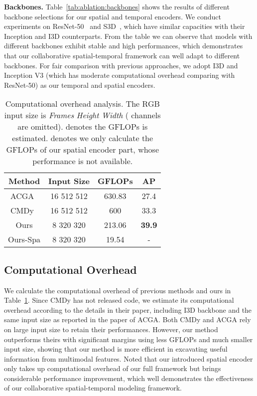 \documentclass[final]{cvpr}
\begin{document}
\textbf{Backbones.} 
Table~\ref{tab:ablation:backbones} shows the results of different backbone selections for our spatial and temporal encoders. 
We conduct experiments on ResNet-50~\cite{he2016deep} and S3D~\cite{xie2018rethinking}, which have similar capacities with their Inception and I3D counterparts. 
From the table we can observe that models with different backbones exhibit stable and high performances, which demonstrates that our collaborative spatial-temporal framework can well adapt to different backbones. 
For fair comparison with previous approaches, we adopt I3D and Inception V3 (which has moderate computational overhead comparing with ResNet-50) as our temporal and spatial encoders.

\begin{table}[!htbp]
   \centering
   \begin{tabular}{|c|c|c|c|}
      \hline
      \textbf{Method} & \textbf{Input Size} & \textbf{GFLOPs} & \textbf{AP} \\
      \hline
      ACGA~\cite{wang2019asymmetric} & 16  512  512 & 630.83 & 27.4 \\
      CMDy~\cite{wang2020context}  & 16  512  512 &  600 & 33.3 \\
      Ours & 8  320  320 & 213.06 & \textbf{39.9} \\
      Ours-Spa  & 8  320  320 & 19.54 & - \\
      \hline
   \end{tabular}
   \caption{Computational overhead analysis. The RGB input size is \emph{Frames}  \emph{Height}  \emph{Width} ( channels are omitted).  denotes the GFLOPs is estimated.  denotes we only calculate the GFLOPs of our spatial encoder part, whose performance is not available.}
   \label{tab:computation}
\end{table}

\subsection{Computational Overhead}
We calculate the computational overhead of previous methods and ours in Table~\ref{tab:computation}. 
Since CMDy has not released code, we estimate its computational overhead according to the details in their paper, including I3D backbone and the same input size as reported in the paper of ACGA. 
Both CMDy and ACGA rely on large input size to retain their performances. 
However, our method outperforms theirs with significant margins using  less GFLOPs and much smaller input size, showing that our method is more efficient in excavating useful information from multimodal features. 
Noted that our introduced spatial encoder only takes up  computational overhead of our full framework but brings considerable performance improvement, which well demonstrates the effectiveness of our collaborative spatial-temporal modeling framework.
\end{document}
